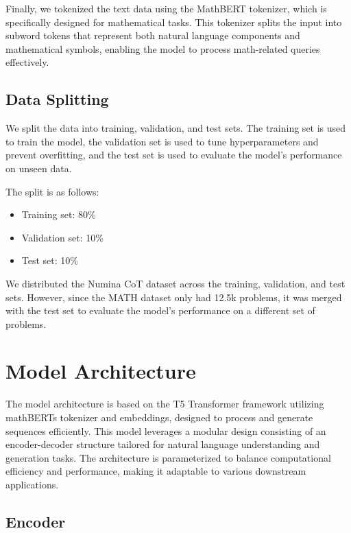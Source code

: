 \documentclass{article}
\begin{document}
Finally, we tokenized the text data using the MathBERT tokenizer, which is specifically designed for mathematical tasks. This tokenizer splits the input into subword tokens that represent both natural language components and mathematical symbols, enabling the model to process math-related queries effectively.

\subsection{Data Splitting}
We split the data into training, validation, and test sets. The training set is used to train the model, the validation set is used to tune hyperparameters and prevent overfitting, and the test set is used to evaluate the model's performance on unseen data.

The split is as follows:
\begin{itemize}
  \item Training set: 80\%
  \item Validation set: 10\%
  \item Test set: 10\%
\end{itemize}

We distributed the Numina CoT dataset across the training, validation, and test sets. However, since the MATH dataset only had 12.5k problems, it was merged with the test set to evaluate the model's performance on a different set of problems.

\section{Model Architecture}

The model architecture is based on the T5 Transformer framework utilizing mathBERTs tokenizer and embeddings, designed to process and generate sequences efficiently. This model leverages a modular design consisting of an encoder-decoder structure tailored for natural language understanding and generation tasks. The architecture is parameterized to balance computational efficiency and performance, making it adaptable to various downstream applications.

\subsection{Encoder}
\end{document}
